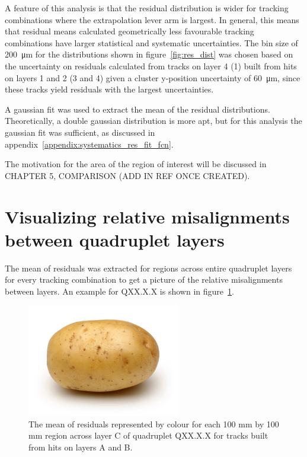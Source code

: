 A feature of this analysis is that the residual distribution is wider for tracking combinations where the extrapolation lever arm is largest. In general, this means that residual means calculated geometrically less favourable tracking combinations have larger statistical and systematic uncertainties. The bin size of \SI{200}{\micro\meter} for the distributions shown in figure~\ref{fig:res_dist} was chosen based on the uncertainty on residuals calculated from tracks on layer 4 (1) built from hits on layers 1 and 2 (3 and 4) given a cluster y-position uncertainty of \SI{60}{\micro\meter}, since these tracks yield residuals with the largest uncertainties.

A gaussian fit was used to extract the mean of the residual distributions. Theoretically, a double gaussian distribution is more apt, but for this analysis the gaussian fit was sufficient, as discussed in appendix~\ref{appendix:systematics_res_fit_fcn}.

The motivation for the area of the region of interest will be discussed in CHAPTER 5, COMPARISON (ADD IN REF ONCE CREATED).

\section{Visualizing relative misalignments between quadruplet layers}

The mean of residuals was extracted for regions across entire quadruplet layers for every tracking combination to get a picture of the relative misalignments between layers. An example for QXX.X.X is shown in figure~\ref{fig:res_mean_th2}.

\begin{figure}
    \centering
    \includegraphics[width = 0.6\textwidth]{figures/potato.jpg}
    \caption{The mean of residuals represented by colour for each 100 mm by 100 mm region across layer C of quadruplet QXX.X.X for tracks built from hits on layers A and B.}
    \label{fig:res_mean_th2}
\end{figure}

